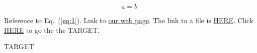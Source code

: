 \documentclass[12pt, a4paper]{article}
\begin{document}
\begin{equation}
	\label{eq:1}
	a = b
\end{equation}

Reference to Eq.~(\ref{eq:1}).  Link to \href{https://www.thaimooc.org}{our web page}.  The link to a file is \href{run:./file.txt}{HERE}.  Click \hyperlink{link1}{HERE} to go the the TARGET.

\newpage
\hypertarget{link1}{TARGET}
\end{document}
